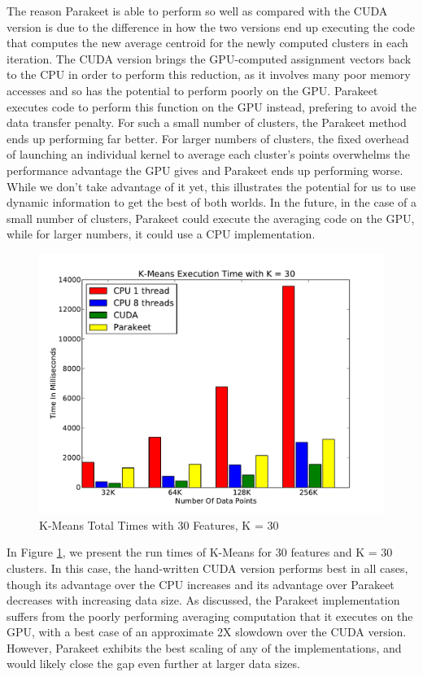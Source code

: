 \documentclass[preprint]{sigplanconf}
\begin{document}
The reason Parakeet is able to perform so well as compared with the CUDA version is due to the difference in how the two versions end up executing the code that computes the new average centroid for the newly computed clusters in each iteration.  The CUDA version brings the GPU-computed assignment vectors back to the CPU in order to perform this reduction, as it involves many poor memory accesses and so has the potential to perform poorly on the GPU.  Parakeet executes code to perform this function on the GPU instead, prefering to avoid the data transfer penalty.  For such a small number of clusters, the Parakeet method ends up performing far better.  For larger numbers of clusters, the fixed overhead of launching an individual kernel to average each cluster's points overwhelms the performance advantage the GPU gives and Parakeet ends up performing worse. While we don't take advantage of it yet, this illustrates the potential for us to use dynamic information to get the best of both worlds.  In the future, in the case of a small number of clusters, Parakeet could execute the averaging code on the GPU, while for larger numbers, it could use a CPU implementation.

\begin{figure}
\includegraphics[scale=0.45]{KMCPUK30.pdf}
\caption{K-Means Total Times with 30 Features, K = 30}
\label{KMCPU30}
\end{figure}

In Figure \ref{KMCPU30}, we present the run times of K-Means for 30 features and K = 30 clusters.  In this case, the hand-written CUDA version performs best in all cases, though its advantage over the CPU increases and its advantage over Parakeet decreases with increasing data size.  As discussed, the Parakeet implementation suffers from the poorly performing averaging computation that it executes on the GPU, with a best case of an approximate 2X slowdown over the CUDA version.  However, Parakeet exhibits the best scaling of any of the implementations, and would likely close the gap even further at larger data sizes.
\end{document}

